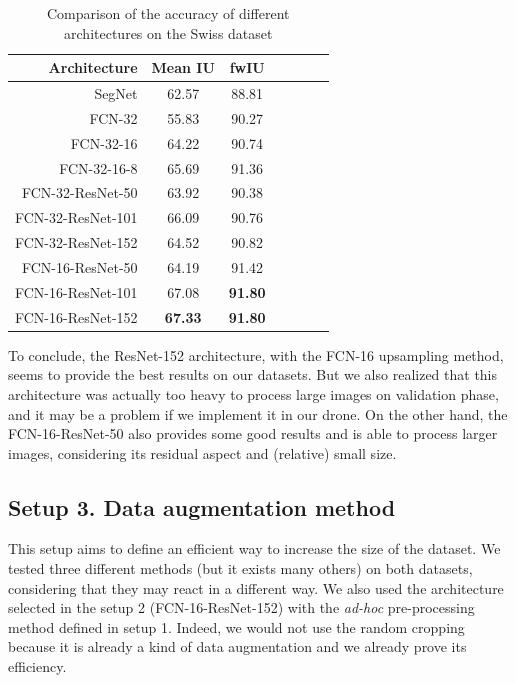 \begin{table}[htbp]
  \centering
  
  \begin{tabular}{rcccccc}
  \rowcolor{gray!50}
  \toprule
  \textbf{Architecture} & \textbf{Mean IU} & \textbf{fwIU} \\
  \midrule
  SegNet &				62.57 & 				88.81 \\
  \midrule
  FCN-32 &				55.83 & 				90.27 \\
  FCN-32-16 &			64.22 & 				90.74 \\
  FCN-32-16-8 &			65.69 & 				91.36 \\
  \midrule
  FCN-32-ResNet-50 &		63.92 & 				90.38 \\
  FCN-32-ResNet-101 &	66.09 & 				90.76 \\
  FCN-32-ResNet-152 &	64.52 & 				90.82 \\
  \midrule
  FCN-16-ResNet-50 &		64.19 & 				91.42 \\
  FCN-16-ResNet-101 &	67.08 & 				\textbf{91.80} \\
  FCN-16-ResNet-152 &	\textbf{67.33} & 	\textbf{91.80} \\
  \bottomrule
  \end{tabular}%
  
  \caption{Comparison of the accuracy of different architectures on the Swiss dataset}
  \label{part4:setup2}
\end{table}%

To conclude, the ResNet-152 architecture, with the FCN-16 upsampling method, seems to provide the best results on our datasets. But we also realized that this architecture was actually too heavy to process large images on validation phase, and it may be a problem if we implement it in our drone. On the other hand, the FCN-16-ResNet-50 also provides some good results and is able to process larger images, considering its residual aspect and (relative) small size.


\subsection*{Setup 3. Data augmentation method}
This setup aims to define an efficient way to increase the size of the dataset. We tested three different methods (but it exists many others) on both datasets, considering that they may react in a different way. We also used the architecture selected in the setup 2 (FCN-16-ResNet-152) with the \textit{ad-hoc} pre-processing method defined in setup 1. Indeed, we would not use the random cropping because it is already a kind of data augmentation and we already prove its efficiency.

